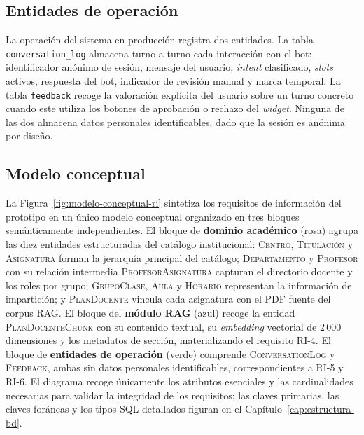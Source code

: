 \subsection{Entidades de operación}\label{subsec:ri-operacion}

La operación del sistema en producción registra dos entidades. La tabla \texttt{conversation\_log} almacena turno a turno cada interacción con el bot: identificador anónimo de sesión, mensaje del usuario, \textit{intent} clasificado, \textit{slots} activos, respuesta del bot, indicador de revisión manual y marca temporal. La tabla \texttt{feedback} recoge la valoración explícita del usuario sobre un turno concreto cuando este utiliza los botones de aprobación o rechazo del \textit{widget}. Ninguna de las dos almacena datos personales identificables, dado que la sesión es anónima por diseño.

\subsection{Modelo conceptual}\label{subsec:ri-modelo-conceptual}

La Figura~\ref{fig:modelo-conceptual-ri} sintetiza los requisitos de información del prototipo en un único modelo conceptual organizado en tres bloques semánticamente independientes. El bloque de \textbf{dominio académico} (rosa) agrupa las diez entidades estructuradas del catálogo institucional: \textsc{Centro}, \textsc{Titulación} y \textsc{Asignatura} forman la jerarquía principal del catálogo; \textsc{Departamento} y \textsc{Profesor} con su relación intermedia \textsc{ProfesorAsignatura} capturan el directorio docente y los roles por grupo; \textsc{GrupoClase}, \textsc{Aula} y \textsc{Horario} representan la información de impartición; y \textsc{PlanDocente} vincula cada asignatura con el PDF fuente del corpus RAG. El bloque del \textbf{módulo RAG} (azul) recoge la entidad \textsc{PlanDocenteChunk} con su contenido textual, su \textit{embedding} vectorial de 2\,000 dimensiones y los metadatos de sección, materializando el requisito RI-4. El bloque de \textbf{entidades de operación} (verde) comprende \textsc{ConversationLog} y \textsc{Feedback}, ambas sin datos personales identificables, correspondientes a RI-5 y RI-6. El diagrama recoge únicamente los atributos esenciales y las cardinalidades necesarias para validar la integridad de los requisitos; las claves primarias, las claves foráneas y los tipos SQL detallados figuran en el Capítulo~\ref{cap:estructura-bd}.

